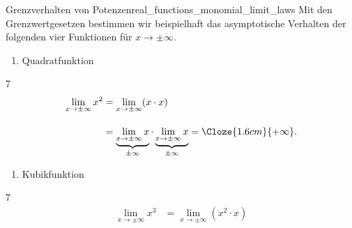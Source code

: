 \begin{ExampleBox}{Grenzverhalten von Potenzen}{real_functions_monomial_limit_laws}
  Mit den Grenzwertgesetzen bestimmen wir beispielhaft das asymptotische
  Verhalten der folgenden vier Funktionen für $x\to\pm\infty$.
  \par\smallskip\noindent
  \begin{minipage}[t]{0.47\linewidth}
    \begin{enumerate}[label=\alph*),leftmargin=*,topsep=0pt]
      \item Quadratfunktion
    \end{enumerate}
    \vspace{0.4\baselineskip}
    \begin{minipage}[c][5.2cm][c]{\linewidth}
      \centering
    \end{minipage}
    \par\vspace{0.6\baselineskip}
    \begin{ClozeArea}[16]{7}
      \[
        \begin{aligned}
          \lim_{x\to\pm\infty}x^2&=\lim_{x\to\pm\infty}(x\cdot x)\\[1em]
          &=\underbrace{\lim_{x\to\pm\infty}x}_{\pm\infty}
            \cdot\underbrace{\lim_{x\to\pm\infty}x}_{\pm\infty}
          =\Cloze{1.6cm}{+\infty}.
        \end{aligned}
      \]
    \end{ClozeArea}
  \end{minipage}\hfill
  \begin{minipage}[t]{0.47\linewidth}
    \begin{enumerate}[label=\alph*),start=2,leftmargin=*,topsep=0pt]
      \item Kubikfunktion
    \end{enumerate}
    \vspace{0.4\baselineskip}
    \begin{minipage}[c][5.2cm][c]{\linewidth}
      \centering
    \end{minipage}
    \par\vspace{0.6\baselineskip}
    \begin{ClozeArea}[16]{7}
      \[
        \begin{aligned}
          \lim_{x\to\pm\infty}x^3&=\lim_{x\to\pm\infty}(x^2\cdot x)\\[1em]

\end{aligned}\]
\end{ClozeArea}
\end{minipage}
\end{ExampleBox}
